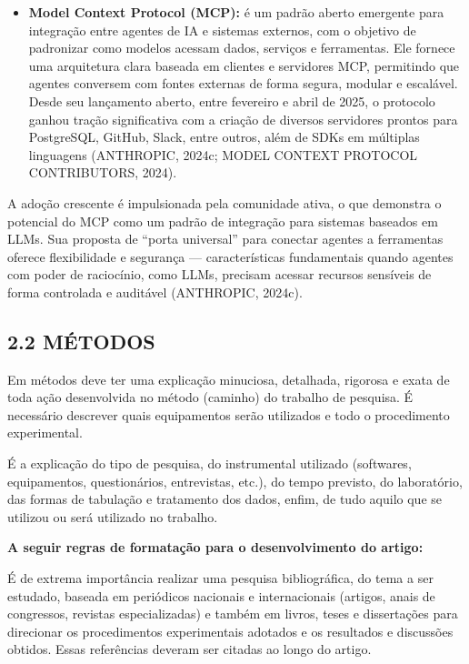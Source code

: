 \documentclass[
]{article}
\providecommand{\tightlist}{%
  \setlength{\itemsep}{0pt}\setlength{\parskip}{0pt}}
\begin{document}
\begin{itemize}
\tightlist
\item
  \textbf{Model Context Protocol (MCP):} é um padrão aberto emergente
  para integração entre agentes de IA e sistemas externos, com o
  objetivo de padronizar como modelos acessam dados, serviços e
  ferramentas. Ele fornece uma arquitetura clara baseada em clientes e
  servidores MCP, permitindo que agentes conversem com fontes externas
  de forma segura, modular e escalável. Desde seu lançamento aberto,
  entre fevereiro e abril de 2025, o protocolo ganhou tração
  significativa com a criação de diversos servidores prontos para
  PostgreSQL, GitHub, Slack, entre outros, além de SDKs em múltiplas
  linguagens (ANTHROPIC, 2024c; MODEL CONTEXT PROTOCOL CONTRIBUTORS,
  2024).
\end{itemize}

A adoção crescente é impulsionada pela comunidade ativa, o que demonstra
o potencial do MCP como um padrão de integração para sistemas baseados
em LLMs. Sua proposta de ``porta universal'' para conectar agentes a
ferramentas oferece flexibilidade e segurança --- características
fundamentais quando agentes com poder de raciocínio, como LLMs, precisam
acessar recursos sensíveis de forma controlada e auditável (ANTHROPIC,
2024c).

\subsection{2.2 MÉTODOS}\label{muxe9todos}

Em métodos deve ter uma explicação minuciosa, detalhada, rigorosa e
exata de toda ação desenvolvida no método (caminho) do trabalho de
pesquisa. É necessário descrever quais equipamentos serão utilizados e
todo o procedimento experimental.

É a explicação do tipo de pesquisa, do instrumental utilizado
(softwares, equipamentos, questionários, entrevistas, etc.), do tempo
previsto, do laboratório, das formas de tabulação e tratamento dos
dados, enfim, de tudo aquilo que se utilizou ou será utilizado no
trabalho.

\textbf{A seguir regras de formatação para o desenvolvimento do artigo:}

É de extrema importância realizar uma pesquisa bibliográfica, do tema a
ser estudado, baseada em periódicos nacionais e internacionais (artigos,
anais de congressos, revistas especializadas) e também em livros, teses
e dissertações para direcionar os procedimentos experimentais adotados e
os resultados e discussões obtidos. Essas referências deveram ser
citadas ao longo do artigo.
\end{document}
